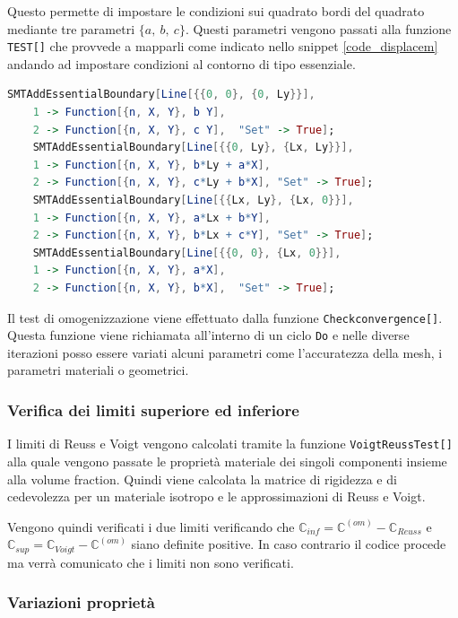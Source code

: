 \documentclass[a4paper,num-refs]{oup-contemporary}
\begin{document}
Questo permette di impostare le condizioni sui quadrato bordi del quadrato mediante tre parametri $\{a,\:b,\:c\}$. Questi parametri vengono passati alla funzione \texttt{TEST[]} che provvede a mapparli come indicato nello snippet  \ref{code_displacem} andando ad impostare condizioni al contorno di tipo essenziale.  

\begin{lstlisting}[language=Mathematica,caption=Algortimo per l'applicazione automatizzate delle condizioni al bordo,label=code_displacem]
	SMTAddEssentialBoundary[Line[{{0, 0}, {0, Ly}}],
	1 -> Function[{n, X, Y}, b Y],
	2 -> Function[{n, X, Y}, c Y], 	"Set" -> True];
	SMTAddEssentialBoundary[Line[{{0, Ly}, {Lx, Ly}}],
	1 -> Function[{n, X, Y}, b*Ly + a*X],
	2 -> Function[{n, X, Y}, c*Ly + b*X], "Set" -> True];
	SMTAddEssentialBoundary[Line[{{Lx, Ly}, {Lx, 0}}], 
	1 -> Function[{n, X, Y}, a*Lx + b*Y],
	2 -> Function[{n, X, Y}, b*Lx + c*Y], "Set" -> True];
	SMTAddEssentialBoundary[Line[{{0, 0}, {Lx, 0}}],
	1 -> Function[{n, X, Y}, a*X],
	2 -> Function[{n, X, Y}, b*X], 	"Set" -> True];
\end{lstlisting}


Il test di omogenizzazione viene effettuato dalla funzione \texttt{Checkconvergence[]}. Questa funzione viene richiamata all'interno di un ciclo \texttt{Do} e nelle diverse iterazioni posso essere variati alcuni parametri come l'accuratezza della mesh, i parametri materiali o geometrici. 


\subsubsection{Verifica dei limiti superiore ed inferiore}

I limiti di Reuss e Voigt vengono calcolati tramite la funzione \texttt{VoigtReussTest[]} alla quale vengono passate le proprietà materiale dei singoli componenti insieme alla volume fraction. Quindi viene calcolata la matrice di rigidezza e di cedevolezza per un materiale isotropo e le approssimazioni di Reuss e Voigt. 

Vengono quindi verificati i due limiti verificando che $\mathbb C_{inf}=\mathbb C^{(om)}-\mathbb C_{Reuss} $ e $\mathbb C_{sup}=\mathbb C_{Voigt} - \mathbb C^{(om)}$ siano definite positive. In caso contrario il codice procede ma verrà comunicato che i limiti non sono verificati. 


\subsubsection{Variazioni proprietà}
\end{document}
